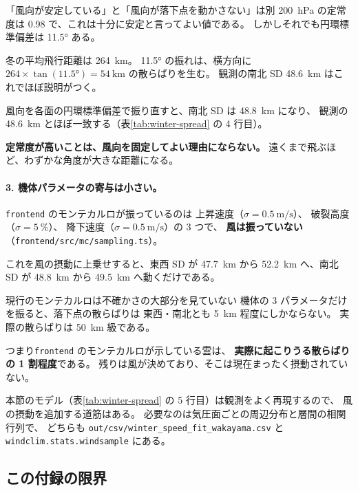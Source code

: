 \begin{whybox}{「風向が安定している」と「風向が落下点を動かさない」は別}
\SI{200}{\hecto\pascal} の定常度は 0.98 で、これは十分に安定と言ってよい値である。
しかしそれでも円環標準偏差は \ang{11.5} ある。

冬の平均飛行距離は \SI{264}{\kilo\metre}。
\ang{11.5} の振れは、横方向に
$264 \times \tan(\ang{11.5}) = \SI{54}{\kilo\metre}$ の散らばりを生む。
観測の南北 SD \SI{48.6}{\kilo\metre} はこれでほぼ説明がつく。

風向を各面の円環標準偏差で振り直すと、南北 SD は \SI{48.8}{\kilo\metre} になり、
観測の \SI{48.6}{\kilo\metre} とほぼ一致する（表\ref{tab:winter-spread} の 4 行目）。

\textbf{定常度が高いことは、風向を固定してよい理由にならない。}
遠くまで飛ぶほど、わずかな角度が大きな距離になる。
\end{whybox}

\paragraph{3. 機体パラメータの寄与は小さい。}
\texttt{frontend} のモンテカルロが振っているのは
上昇速度（$\sigma = \SI{0.5}{\metre\per\second}$）、
破裂高度（$\sigma = 5\ \%$）、
降下速度（$\sigma = \SI{0.5}{\metre\per\second}$）の 3 つで、
\textbf{風は振っていない}（\texttt{frontend/src/mc/sampling.ts}）。

これを風の摂動に上乗せすると、東西 SD が \SI{47.7}{\kilo\metre} から
\SI{52.2}{\kilo\metre} へ、南北 SD が \SI{48.8}{\kilo\metre} から
\SI{49.5}{\kilo\metre} へ動くだけである。

\begin{whybox}{現行のモンテカルロは不確かさの大部分を見ていない}
機体の 3 パラメータだけを振ると、落下点の散らばりは
東西・南北とも \SI{5}{\kilo\metre} 程度にしかならない。
実際の散らばりは \SI{50}{\kilo\metre} 級である。

つまり\texttt{frontend} のモンテカルロが示している雲は、
\textbf{実際に起こりうる散らばりの 1 割程度}である。
残りは風が決めており、そこは現在まったく摂動されていない。

本節のモデル（表\ref{tab:winter-spread} の 5 行目）は観測をよく再現するので、
風の摂動を追加する道筋はある。
必要なのは気圧面ごとの周辺分布と層間の相関行列で、
どちらも \texttt{out/csv/winter\_speed\_fit\_wakayama.csv} と
\texttt{windclim.stats.windsample} にある。
\end{whybox}

\subsection{この付録の限界}

